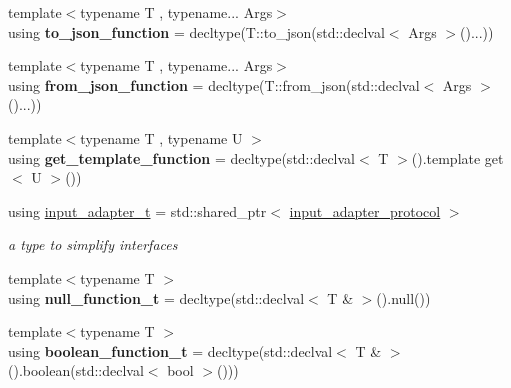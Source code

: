 \begin{DoxyCompactItemize}
{\footnotesize template$<$typename T , typename... Args$>$ }\\using {\bfseries to\+\_\+json\+\_\+function} = decltype(T\+::to\+\_\+json(std\+::declval$<$ Args $>$()...))
\item 
\mbox{\label{namespacenlohmann_1_1detail_a1711ee5cef66a0523055c8d9f024f322}} 
{\footnotesize template$<$typename T , typename... Args$>$ }\\using {\bfseries from\+\_\+json\+\_\+function} = decltype(T\+::from\+\_\+json(std\+::declval$<$ Args $>$()...))
\item 
\mbox{\label{namespacenlohmann_1_1detail_ab4d22cdb6521ee3508db496dea66711e}} 
{\footnotesize template$<$typename T , typename U $>$ }\\using {\bfseries get\+\_\+template\+\_\+function} = decltype(std\+::declval$<$ T $>$().template get$<$ U $>$())
\item 
\mbox{\label{namespacenlohmann_1_1detail_ae132f8cd5bb24c5e9b40ad0eafedf1c2}} 
using \mbox{\hyperlink{namespacenlohmann_1_1detail_ae132f8cd5bb24c5e9b40ad0eafedf1c2}{input\+\_\+adapter\+\_\+t}} = std\+::shared\+\_\+ptr$<$ \mbox{\hyperlink{structnlohmann_1_1detail_1_1input__adapter__protocol}{input\+\_\+adapter\+\_\+protocol}} $>$
\begin{DoxyCompactList}\small\item\em a type to simplify interfaces \end{DoxyCompactList}\item 
\mbox{\label{namespacenlohmann_1_1detail_ac1b4e524746bf8b790b2b776048b93c4}} 
{\footnotesize template$<$typename T $>$ }\\using {\bfseries null\+\_\+function\+\_\+t} = decltype(std\+::declval$<$ T \& $>$().null())
\item 
\mbox{\label{namespacenlohmann_1_1detail_a45ec87326503b8884b664a9ef23a6c99}} 
{\footnotesize template$<$typename T $>$ }\\using {\bfseries boolean\+\_\+function\+\_\+t} = decltype(std\+::declval$<$ T \& $>$().boolean(std\+::declval$<$ bool $>$()))
\item 
\mbox{\label{namespacenlohmann_1_1detail_a4a3e14a011b9ea1ff849fc6d2411e6a0}} 

\end{DoxyCompactItemize}
